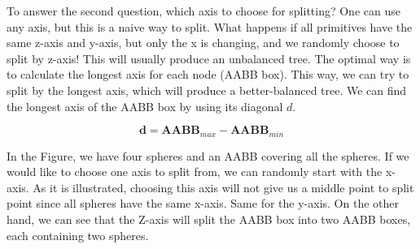 \documentclass[11pt,a4paper]{article}
\begin{document}
To answer the second question, which axis to choose for splitting? One can use any axis, but this is a naive way to split. What happens if all primitives have the same z-axis and y-axis, but only the x is changing, and we randomly choose to split by z-axis! This will usually produce an unbalanced tree. The optimal way is to calculate the longest axis for each node (AABB box). This way, we can try to split by the longest axis, which will produce a better-balanced tree. We can find the longest axis of the AABB box by using its diagonal $d$.  

\begin{equation}
\textbf{d} = \textbf{AABB}_{max} - \textbf{AABB}_{min}
\end{equation}

In the Figure, we have four spheres and an AABB covering all the spheres. If we would like to choose one axis to split from, we can randomly start with the x-axis. As it is illustrated, choosing this axis will not give us a middle point to split point since all spheres have the same x-axis. Same for the y-axis. On the other hand, we can see that the Z-axis will split the AABB box into two AABB boxes, each containing two spheres. 
\end{document}
